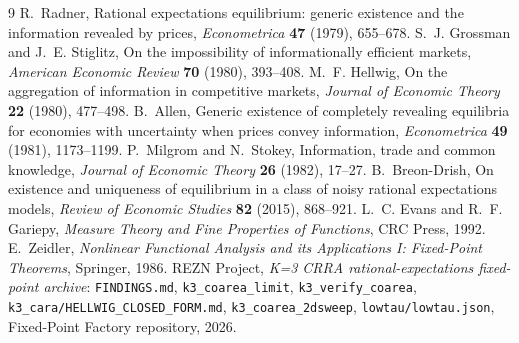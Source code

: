 \documentclass[11pt]{article}
\theoremstyle{definition}
\begin{document}
\begin{thebibliography}{9}
 R.~Radner, Rational expectations equilibrium: generic
existence and the information revealed by prices, \emph{Econometrica}
\textbf{47} (1979), 655--678.
 S.~J. Grossman and J.~E. Stiglitz, On the
impossibility of informationally efficient markets, \emph{American Economic
Review} \textbf{70} (1980), 393--408.
 M.~F. Hellwig, On the aggregation of information in
competitive markets, \emph{Journal of Economic Theory} \textbf{22} (1980),
477--498.
 B.~Allen, Generic existence of completely revealing
equilibria for economies with uncertainty when prices convey information,
\emph{Econometrica} \textbf{49} (1981), 1173--1199.
 P.~Milgrom and N.~Stokey, Information, trade and
common knowledge, \emph{Journal of Economic Theory} \textbf{26} (1982),
17--27.
 B.~Breon-Drish, On existence and uniqueness of
equilibrium in a class of noisy rational expectations models,
\emph{Review of Economic Studies} \textbf{82} (2015), 868--921.
 L.~C. Evans and R.~F. Gariepy, \emph{Measure Theory
and Fine Properties of Functions}, CRC Press, 1992.
 E.~Zeidler, \emph{Nonlinear Functional Analysis and its
Applications I: Fixed-Point Theorems}, Springer, 1986.
 REZN Project, \emph{K=3 CRRA rational-expectations
fixed-point archive}: \texttt{FINDINGS.md},
\texttt{k3\_coarea\_limit}, \texttt{k3\_verify\_coarea},
\texttt{k3\_cara/HELLWIG\_CLOSED\_FORM.md},
\texttt{k3\_coarea\_2dsweep}, \texttt{lowtau/lowtau.json},
Fixed-Point Factory repository, 2026.
\end{thebibliography}
\end{document}
